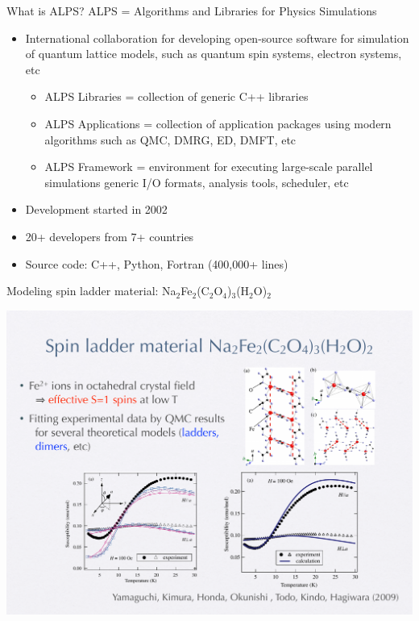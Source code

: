 \begin{frame}[t,fragile]{What is ALPS?}
  ALPS = \alert{A}lgorithms and \alert{L}ibraries for \alert{P}hysics \alert{S}imulations
  \begin{itemize}
  \item International collaboration for developing open-source
    software for simulation of quantum lattice models, such as
    quantum spin systems, electron systems, etc
    \begin{itemize}
    \item ALPS Libraries = collection of generic C++ libraries
    \item ALPS Applications = collection of application packages
      using modern algorithms such as QMC, DMRG, ED, DMFT, etc
    \item ALPS Framework = environment for executing large-scale
      parallel simulations generic I/O formats, analysis tools,
      scheduler, etc
    \end{itemize}
  \item Development started in 2002
  \item 20+ developers from 7+ countries
  \item Source code: C++, Python, Fortran (400,000+ lines)
  \end{itemize}
\end{frame}

\begin{frame}[fragile]{Modeling spin ladder material: Na$_2$Fe$_2$(C$_2$O$_4$)$_3$(H$_2$O)$_2$}
  \begin{center}
    \includegraphics[height=.8\textheight]{ladder.pdf}
  \end{center}
\end{frame}

